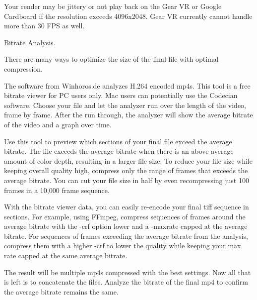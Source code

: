 \begin{fullwidth}
\tip Your render may be jittery or not play back on the Gear VR or Google Cardboard if the resolution exceeds 4096x2048. Gear VR currently cannot handle more than 30 FPS as well.

{\large Bitrate Analysis. \par}

There are many ways to optimize the size of the final file with optimal compression. 

The software from Winhoros.de analyzes H.264 encoded mp4s. This tool is a free bitrate viewer for PC users only. Mac users can potentially use the Codecian software. Choose your file and let the analyzer run over the length of the video, frame by frame. After the run through, the analyzer will show the average bitrate of the video and a graph over time. 

Use this tool to preview which sections of your final file exceed the average bitrate. The file exceeds the average bitrate when there is an above average amount of color depth, resulting in a larger file size. To reduce your file size while keeping overall quality high, compress only the range of frames that exceeds the average bitrate. You can cut your file size in half by even recompressing just 100 frames in a 10,000 frame sequence.

With the bitrate viewer data, you can easily re-encode your final tiff sequence in sections. For example, using FFmpeg, compress sequences of frames around the average bitrate with the -crf option lower and a -maxrate capped at the average bitrate. For sequences of frames exceeding the average bitrate from the analysis, compress them with a higher -crf to lower the quality while keeping your max rate capped at the same average bitrate.

The result will be multiple mp4s compressed with the best settings. Now all that is left is to concatenate the files. Analyze the bitrate of the final mp4 to confirm the average bitrate remains the same.


\clearpage
\end{fullwidth}